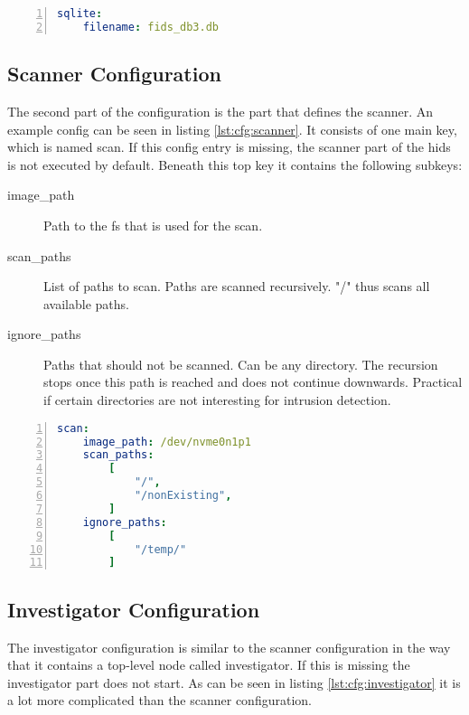 \begin{lstlisting}[language=yaml, numbers=left, caption=SQLite Configuration, label=lst:cfg:sqlite]
sqlite:
	filename: fids_db3.db
\end{lstlisting}

\subsection{Scanner Configuration}

The second part of the configuration is the part that defines the scanner. An example config can be seen in listing \ref{lst:cfg:scanner}. It consists of one main key, which is named scan. If this config entry is missing, the scanner part of the \gls{hids} is not executed by default. Beneath this top key it contains the following subkeys:

\begin{description}
	\item [image\_path] Path to the \gls{fs} that is used for the scan.
	\item [scan\_paths] List of paths to scan. Paths are scanned recursively. "/" thus scans all available paths.
	\item [ignore\_paths] Paths that should not be scanned. Can be any directory. The recursion stops once this path is reached and does not continue downwards. Practical if certain directories are not interesting for intrusion detection.
\end{description}

\begin{lstlisting}[language=yaml, numbers=left, caption=Scanner Configuration, label=lst:cfg:scanner]
scan:
	image_path: /dev/nvme0n1p1
	scan_paths: 
		[
			"/",
			"/nonExisting",
		]
	ignore_paths: 
		[
			"/temp/"
		]
\end{lstlisting}

\subsection{Investigator Configuration}
\label{sec:conf:investigator}

The investigator configuration is similar to the scanner configuration in the way that it contains a top-level node called investigator. If this is missing the investigator part does not start. As can be seen in listing \ref{lst:cfg:investigator} it is a lot more complicated than the scanner configuration. 

